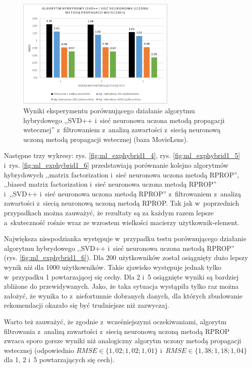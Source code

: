 \documentclass[twoside]{iisthesis}
\begin{document}
		\begin{figure}
			\centering
			\includegraphics[width=0.7\textwidth]{ml_exphybrid1_3}			
			\caption{Wyniki eksperymentu porównującego działanie algorytmu hybrydowego ,,SVD++ i~sieć neuronowa uczona metodą propagacji wstecznej'' z~filtrowaniem z~analizą zawartości z~siecią neuronową uczoną metodą propagacji wstecznej (baza MovieLens).}
			\label{fig:ml_exphybrid1_3}
		\end{figure}
		
		Następne trzy wykresy: rys. \ref{fig:ml_exphybrid1_4}, rys. \ref{fig:ml_exphybrid1_5} i~rys. \ref{fig:ml_exphybrid1_6} przedstawiają porównanie kolejno algorytmów hybrydowych ,,matrix factorization i~sieć neuronowa uczona metodą RPROP'', ,,biased matrix factorization i~sieć neuronowa uczona metodą RPROP'' i~,,SVD++ i~sieć neuronowa uczona metodą RPROP'' z~filtrowaniem z~analizą zawartości z~siecią neuronową uczoną metodą RPROP. Tak jak w~poprzednich przypadkach można zauważyć, że rezultaty są za każdym razem lepsze a~skuteczność rośnie wraz ze wzrostem wielkości macierzy użytkownik-element.
		
		Największa niespodzianka występuje w~przypadku testu porównującego działanie algorytmu hybrydowego ,,SVD++ i~sieć neuronowa uczona metodą RPROP'' (rys. \ref{fig:ml_exphybrid1_6}). Dla 200 użytkowników został osiągnięty dużo lepszy wynik niż dla 1000 użytkowników. Takie zjawisko występuje jednak tylko w~przypadku 1 powtarzającej się cechy. Dla 2 i~5 osiągnięte wyniki są bardziej zbliżone do przewidywanych. Jako, że taka sytuacja wystąpiła tylko raz można założyć, że wynika to z~niefortunnie dobranych danych, dla których zbudowanie rekomendacji okazało się być trudniejsze niż zazwyczaj. 
		
		Warto też zauważyć, że zgodnie z~wcześniejszymi oczekiwaniami, algorytm filtrowania z~analizą zawartości z~siecią neuronową uczoną metodą RPROP zwraca sporo gorsze wyniki niż analogiczny algorytm uczony metodą propagacji wstecznej (odpowiednio $RMSE \in \{1,02; 1,02; 1,01\}$ i~$RMSE \in \{1,38; 1,18; 1,04\}$ dla 1, 2 i~5 powtarzających się cech). 
				
\end{document}
